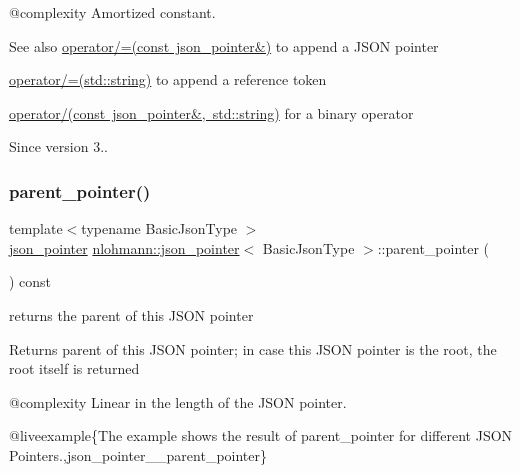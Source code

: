 @complexity Amortized constant.

\begin{DoxySeeAlso}{See also}
\mbox{\hyperlink{classnlohmann_1_1json__pointer_a7395bd0af29ac23fd3f21543c935cdfa}{operator/=(const json\+\_\+pointer\&)}} to append a J\+S\+ON pointer 

\mbox{\hyperlink{classnlohmann_1_1json__pointer_abdd21567b2b1d69329af0f520335e68b}{operator/=(std\+::string)}} to append a reference token 

\mbox{\hyperlink{classnlohmann_1_1json__pointer_a926c9065dbed1bedc17857a813f7a46f}{operator/(const json\+\_\+pointer\&, std\+::string)}} for a binary operator
\end{DoxySeeAlso}
\begin{DoxySince}{Since}
version 3.. 
\end{DoxySince}
\mbox{\label{classnlohmann_1_1json__pointer_afdaacce1edb7145e0434e014f0e8685a}} 
\subsubsection{\texorpdfstring{parent\_pointer()}{parent\_pointer()}}
{\footnotesize\ttfamily template$<$typename Basic\+Json\+Type $>$ \\
\mbox{\hyperlink{classnlohmann_1_1json__pointer}{json\+\_\+pointer}} \mbox{\hyperlink{classnlohmann_1_1json__pointer}{nlohmann\+::json\+\_\+pointer}}$<$ Basic\+Json\+Type $>$\+::parent\+\_\+pointer (\begin{DoxyParamCaption}{ }\end{DoxyParamCaption}) const\hspace{0.3cm}{\ttfamily [inline]}}



returns the parent of this J\+S\+ON pointer 

\begin{DoxyReturn}{Returns}
parent of this J\+S\+ON pointer; in case this J\+S\+ON pointer is the root, the root itself is returned
\end{DoxyReturn}
@complexity Linear in the length of the J\+S\+ON pointer.

@liveexample\{The example shows the result of {\ttfamily parent\+\_\+pointer} for different J\+S\+ON Pointers.,json\+\_\+pointer\+\_\+\+\_\+parent\+\_\+pointer\}

